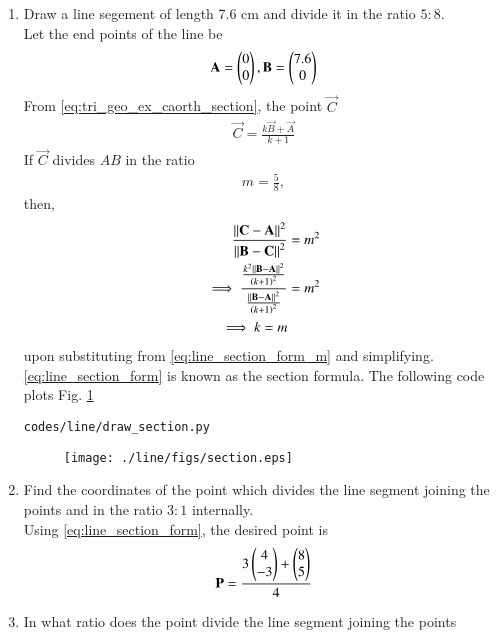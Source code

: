 \begin{enumerate}[label=\arabic*.,ref=\thesubsection.\theenumi]
\item Draw a line segement of length 7.6 cm and divide it in the ratio $5:8$.
\\
\solution Let the end points of the line be 
\begin{align}
\mathbf{A} = \begin{pmatrix}0\\0\end{pmatrix}, \mathbf{B} = \begin{pmatrix}7.6\\0\end{pmatrix}
\end{align}
From \eqref{eq:tri_geo_ex_caorth_section},
the point $\vec{C}$
\begin{align}
\label{eq:line_section_form}
\vec{C} = \frac{k \vec{B} + \vec{A}}{k+1}
\end{align}
If $\vec{C}$ divides $AB$ in the ratio 
\begin{align}
 m = \frac{5}{8},
\end{align}
then,
\begin{align}
\label{eq:line_section_form_m}
\frac{\left\lVert\mathbf{C}-\mathbf{A}\right\rVert^2}{\left\lVert\mathbf{B}-\mathbf{C}\right\rVert^2} &= m^2
\\
\implies \frac{\frac{k^2\left\lVert\mathbf{B}-\mathbf{A}\right\rVert^2}{\left(k+1\right)^2}}{\frac{\left\lVert\mathbf{B}-\mathbf{A}\right\rVert^2}{\left(k+1\right)^2}} &=m^2
\\
\implies k = m &
\end{align}
upon substituting from \eqref{eq:line_section_form_m} and simplifying. \eqref{eq:line_section_form} is known as the section formula.
%
The following code plots Fig. \ref{fig:section}
\begin{lstlisting}
codes/line/draw_section.py
\end{lstlisting}
\begin{figure}[!ht]
\texttt{[image: ./line/figs/section.eps]}
\caption{}
\label{fig:section}
\end{figure}
\item Find the coordinates of the point which divides the line segment joining the points  and  in the ratio $3:1$ internally.
\\
\solution Using \eqref{eq:line_section_form},
the desired point is 
\begin{align}
\mathbf{P} = \frac{3 \begin{pmatrix}4\\-3\end{pmatrix} + \begin{pmatrix}8\\5\end{pmatrix}}{4}
\end{align}
\item In what ratio does the point  divide the line segment joining the points 
%

\end{enumerate}
